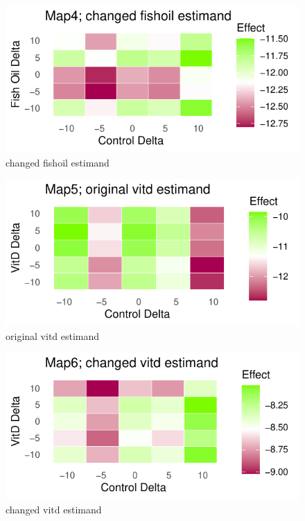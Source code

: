 \documentclass{article}
\newcommand{\pandocbounded}[1]{#1}
\begin{document}
\begin{figure}
\centering
\pandocbounded{\includegraphics[keepaspectratio]{Final_Report_files/figure-latex/unnamed-chunk-47-1.pdf}}
\caption{changed fishoil estimand}
\end{figure}

\begin{figure}
\centering
\pandocbounded{\includegraphics[keepaspectratio]{Final_Report_files/figure-latex/unnamed-chunk-48-1.pdf}}
\caption{original vitd estimand}
\end{figure}

\begin{figure}
\centering
\pandocbounded{\includegraphics[keepaspectratio]{Final_Report_files/figure-latex/unnamed-chunk-49-1.pdf}}
\caption{changed vitd estimand}
\end{figure}
\end{document}
